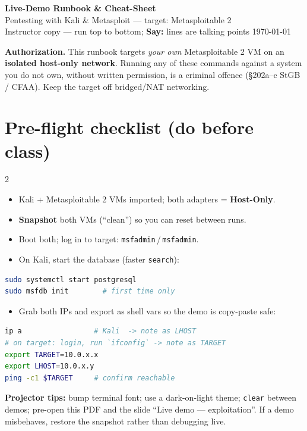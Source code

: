 \documentclass[10pt,a4paper]{article}
\begin{document}
\begin{center}
  {\LARGE\bfseries Live-Demo Runbook \& Cheat-Sheet}\\[0.3em]
  {\large Pentesting with Kali \& Metasploit --- target: Metasploitable 2}\\[0.3em]
  {\small Instructor copy --- run top to bottom; \textcolor{sayPurple}{\textbf{Say:}}
   lines are talking points} \hfill \today
\end{center}
\vspace{0.4em}

\begin{warn}
\textbf{Authorization.} This runbook targets \emph{your own} Metasploitable 2 VM
on an \textbf{isolated host-only network}. Running any of these commands against
a system you do not own, without written permission, is a criminal offence
(\S202a--c StGB / CFAA). Keep the target off bridged/NAT networking.
\end{warn}

\section{Pre-flight checklist (do before class)}
\begin{multicols}{2}
\begin{itemize}[leftmargin=1.2em, itemsep=1pt]
  \item Kali + Metasploitable 2 VMs imported; both adapters = \textbf{Host-Only}.
  \item \textbf{Snapshot} both VMs (``clean'') so you can reset between runs.
  \item Boot both; log in to target: \texttt{msfadmin}\,/\,\texttt{msfadmin}.
  \item On Kali, start the database (faster \texttt{search}):
\end{itemize}
\begin{lstlisting}[language=bash]
sudo systemctl start postgresql
sudo msfdb init        # first time only
\end{lstlisting}
\begin{itemize}[leftmargin=1.2em, itemsep=1pt]
  \item Grab both IPs and export as shell vars so the demo is copy-paste safe:
\end{itemize}
\begin{lstlisting}[language=bash]
ip a                 # Kali  -> note as LHOST
# on target: login, run `ifconfig` -> note as TARGET
export TARGET=10.0.x.x
export LHOST=10.0.x.y
ping -c1 $TARGET     # confirm reachable
\end{lstlisting}
\end{multicols}
\begin{tipbox}\small
\textbf{Projector tips:} bump terminal font; use a dark-on-light theme;
\texttt{clear} between demos; pre-open this PDF and the slide
``Live demo --- exploitation''. If a demo misbehaves, restore the snapshot
rather than debugging live.
\end{tipbox}
\end{document}
